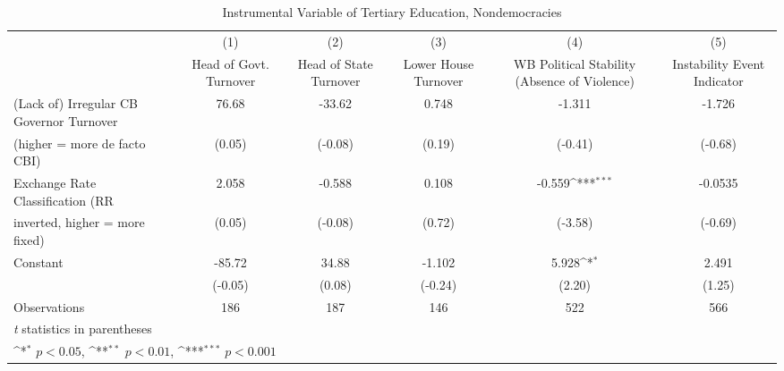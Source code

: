 \begin{table}[htbp]\centering
\def\sym#1{\ifmmode^{#1}\else\(^{#1}\)\fi}
\caption{Instrumental Variable of Tertiary Education, Nondemocracies \label{ndemIfivs2}}
\begin{tabular}{l*{5}{c}}
\toprule
                                        &\multicolumn{1}{c}{(1)}&\multicolumn{1}{c}{(2)}&\multicolumn{1}{c}{(3)}&\multicolumn{1}{c}{(4)}&\multicolumn{1}{c}{(5)}\\
                                        &\multicolumn{1}{c}{Head of Govt. Turnover}&\multicolumn{1}{c}{Head of State Turnover}&\multicolumn{1}{c}{Lower House Turnover}&\multicolumn{1}{c}{WB Political Stability (Absence of Violence)}&\multicolumn{1}{c}{Instability Event Indicator}\\
\midrule
(Lack of) Irregular CB Governor Turnover&    76.68         &   -33.62         &    0.748         &   -1.311         &   -1.726         \\
(higher = more de facto CBI)            &   (0.05)         &  (-0.08)         &   (0.19)         &  (-0.41)         &  (-0.68)         \\
\addlinespace
Exchange Rate Classification (RR        &    2.058         &   -0.588         &    0.108         &   -0.559\sym{***}&  -0.0535         \\
inverted, higher = more fixed)          &   (0.05)         &  (-0.08)         &   (0.72)         &  (-3.58)         &  (-0.69)         \\
\addlinespace
Constant                                &   -85.72         &    34.88         &   -1.102         &    5.928\sym{*}  &    2.491         \\
                                        &  (-0.05)         &   (0.08)         &  (-0.24)         &   (2.20)         &   (1.25)         \\
\midrule
Observations                            &      186         &      187         &      146         &      522         &      566         \\
\bottomrule
\multicolumn{6}{l}{\footnotesize \textit{t} statistics in parentheses}\\
\multicolumn{6}{l}{\footnotesize \sym{*} \(p<0.05\), \sym{**} \(p<0.01\), \sym{***} \(p<0.001\)}\\
\end{tabular}
\end{table}

